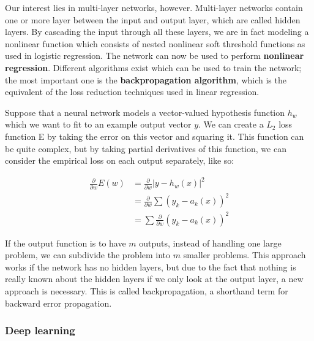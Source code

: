 Our interest lies in multi-layer networks, however. Multi-layer
networks contain one or more layer between the input and output layer,
which are called hidden layers. By cascading the input through all
these layers, we are in fact modeling a nonlinear function which
consists of nested nonlinear soft threshold functions as used in
logistic regression. The network can now be used to perform \textbf{nonlinear
regression}. Different algorithms exist which can be used to train the
network; the most important one is the \textbf{backpropagation algorithm},
which is the equivalent of the loss reduction techniques used in
linear regression.

Suppose that a neural network models a vector-valued hypothesis
function $h_w$ which we want to fit to an example output vector
$y$. We can create a $L_2$ loss function E by taking the error on this
vector and squaring it. This function can be quite complex, but by
taking partial derivatives of this function, we can consider the
empirical loss on each output separately, like so:

\begin{equation}
  \begin{align} 
    \frac{\partial}{\partial w} E(w) &= \frac{\partial}{\partial w} \lvert y - h_w(x) \rvert^2 \\
    &= \frac{\partial}{\partial w} \sum (y_k - a_k(x))^2 \\
    &=  \sum \frac{\partial}{\partial w} (y_k - a_k(x))^2
  \end{align} 
\end{equation}

If the output function is to have $m$ outputs, instead of handling one
large problem, we can subdivide the problem into $m$ smaller
problems. This approach works if the network has no hidden layers, but
due to the fact that nothing is really known about the hidden layers
if we only look at the output layer, a new approach is necessary. This
is called backpropagation, a shorthand term for backward error
propagation.

\subsubsection{Deep learning}
\label{sec:neuralnetworks}


